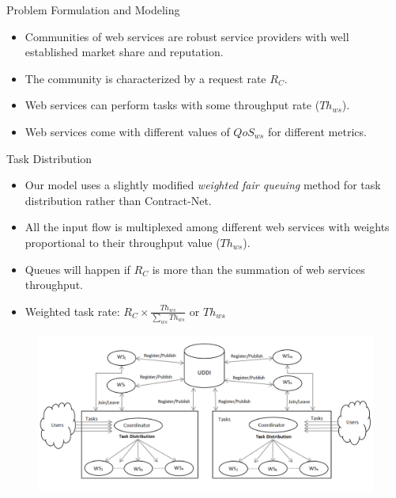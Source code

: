 \documentclass{beamer}
\begin{document}
\begin{frame}{Problem Formulation and Modeling}
    \begin{itemize}
        \item Communities of web services are robust service providers with well established market share and reputation.
        \item The community is characterized by a request rate $R_C$.
        \item Web services can perform tasks with some throughput rate ($Th_{ws}$).
        \item Web services come with different values of $QoS_{ws}$ for different metrics.
    \end{itemize}
\end{frame}

\begin{frame}{Task Distribution}
    \begin{itemize}
        \item Our model uses a slightly modified \emph{weighted fair queuing} method for task distribution rather than Contract-Net.
        \item All the input flow is multiplexed among different web services with weights proportional to their throughput value ($Th_{ws}$).
        \item Queues will happen if $R_C$ is more than the summation of web services throughput.
        \item Weighted task rate: $R_C \times \frac{Th_{ws}}{\sum_{ws}{Th_{ws}}}$ or $Th_{ws}$
    \end{itemize}
    \begin{figure}[htbp]
        \centering
        \includegraphics[width=0.8 \columnwidth]{figures/community.png}
    \end{figure}
\end{frame}
\end{document}
